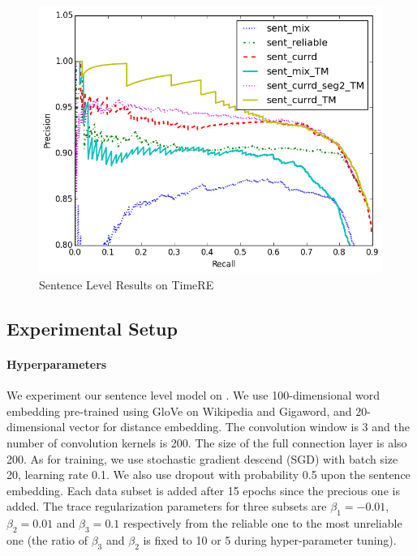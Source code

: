 \begin{figure}[t!]
\begin{center}
\includegraphics[width=0.9\linewidth]{figures/sent_time_exp_overall.png}
\caption{Sentence Level Results on TimeRE}
\label{fig: sent_luo}
\end{center}
\end{figure}

\subsection{Experimental Setup}

\paragraph{Hyperparameters}  
We experiment our sentence level model on \TimeRE. We use 100-dimensional word embedding pre-trained using GloVe \cite{pennington2014glove} on Wikipedia and Gigaword, and 20-dimensional vector for distance embedding. The convolution window is 3 and the number of convolution kernels is 200. The size of the full connection layer is also 200. As for training, we use stochastic gradient descend (SGD) with batch size 20, learning rate 0.1. We also use dropout with probability 0.5 upon the sentence embedding. Each data subset is added after 15 epochs since the precious one is added. The trace regularization parameters for three subsets are $\beta_1=-0.01$, $\beta_2=0.01$ and $\beta_3=0.1$ respectively from the reliable one to the most unreliable one (the ratio of $\beta_3$ and $\beta_2$ is fixed to 10 or 5 during hyper-parameter tuning).


